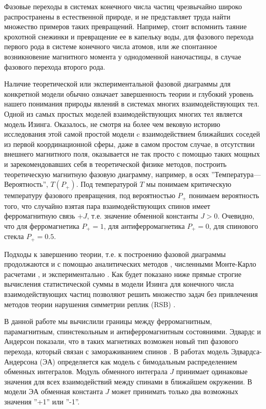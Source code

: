 
{\actuality} Фазовые переходы в системах конечного числа частиц чрезвычайно широко распространены в естественной природе, и не представляет труда найти множество примеров таких превращений. Например, стоит вспомнить таяние крохотной снежинки и превращение ее в капельку воды, для фазового перехода первого рода в системе конечного числа атомов, или же спонтанное возникновение магнитного момента у однодоменной наночастицы, в случае фазового перехода второго рода. 

Наличие теоретической или экспериментальной фазовой диаграммы для конкретной модели обычно означает завершенность теории и глубокий уровень нашего понимания природы явлений в системах многих взаимодействующих тел. Одной из самых простых моделей взаимодействующих многих тел является модель Изинга. Оказалось, не смотря на более чем вековую историю исследования этой самой простой модели c взаимодействием ближайших соседей из первой координационной сферы, даже в самом простом случае, в отсутствии внешнего магнитного поля, оказывается не так просто с помощью таких мощных и зарекомендовавших себя в теоретической физике методов, построить теоретическую магнитную фазовую диаграмму, например, в осях ''Температура---Вероятность'', $T(P_+)$. Под температурой $T$ мы понимаем критическую температуру фазового превращения, под вероятностью $P_+$ понимаем вероятность того, что случайно взятая пара взаимодействующих спинов имеет ферромагнитную связь $+J$, т.е. значение обменной константы $J>0$. Очевидно, что для ферромагнетика $P_+=1$, для антиферромагнетика $P_+=0$, для спинового стекла $P_+=0.5$.

Подходы к завершению теории, т.е. к построению фазовой диаграммы продолжаются и с помощью аналитических методов \cite{belokon2006}, численными Монте-Карло расчетами \cite{Hasenbusch2008}, и экспериментально \cite{Mirebeau2022}. Как будет показано ниже прямые строгие вычисления статистической суммы в модели Изинга для конечного числа взаимодействующих частиц позволяют решить множество задач без привлечения методов теории нарушения симметрии реплик (RSB) \cite{newman2023proof}.

В данной работе мы вычислили границы между ферромагнитным, парамагнитным, спинстекольным и антиферромагнитным состояниями. Эдвардс и Андерсон показали, что в таких магнетиках возможен новый тип фазового перехода, который связан с замораживанием спинов \cite{edwards1975theory}. В работах \cite{Ground2010pmJ, Correlation2005SG} модель Эдвардса-Андерсона (ЭА) определяется как модель с бимодальным распределением обменных интегралов. Модуль обменного интеграла $J$ принимает одинаковые значения для всех взаимодействий между спинами в ближайшем окружении. В модели ЭА обменная константа $J$ может принимать только два возможных значения ''+1'' или ''-1''. 

